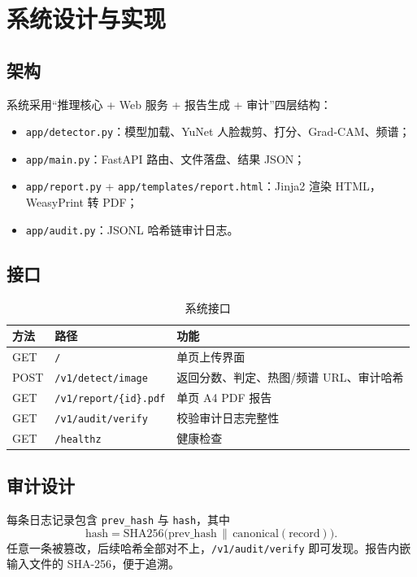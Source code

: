 \section{系统设计与实现}

\subsection{架构}

系统采用“推理核心 + Web 服务 + 报告生成 + 审计”四层结构：

\begin{itemize}
  \item \texttt{app/detector.py}：模型加载、YuNet 人脸裁剪、打分、Grad-CAM、频谱；
  \item \texttt{app/main.py}：FastAPI 路由、文件落盘、结果 JSON；
  \item \texttt{app/report.py} + \texttt{app/templates/report.html}：Jinja2 渲染 HTML，WeasyPrint 转 PDF；
  \item \texttt{app/audit.py}：JSONL 哈希链审计日志。
\end{itemize}

\subsection{接口}

\begin{table}[H]
\centering
\caption{系统接口}
\label{tab:api}
\small
\begin{tabular}{lll}
\toprule
方法 & 路径 & 功能 \\
\midrule
GET & \texttt{/} & 单页上传界面 \\
POST & \texttt{/v1/detect/image} & 返回分数、判定、热图/频谱 URL、审计哈希 \\
GET & \texttt{/v1/report/\{id\}.pdf} & 单页 A4 PDF 报告 \\
GET & \texttt{/v1/audit/verify} & 校验审计日志完整性 \\
GET & \texttt{/healthz} & 健康检查 \\
\bottomrule
\end{tabular}
\end{table}

\subsection{审计设计}

每条日志记录包含 \texttt{prev\_hash} 与 \texttt{hash}，其中
\[
  \mathrm{hash} = \mathrm{SHA256}\big(\mathrm{prev\_hash} \,\|\, \mathrm{canonical(record)}\big).
\]
任意一条被篡改，后续哈希全部对不上，\texttt{/v1/audit/verify} 即可发现。报告内嵌输入文件的 SHA-256，便于追溯。


